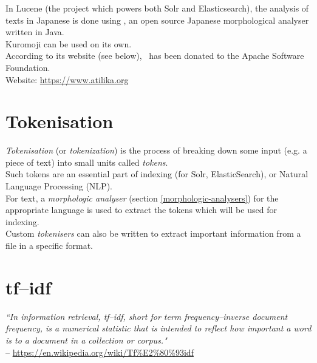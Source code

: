 In Lucene (the project which powers both Solr and Elasticsearch), the analysis of texts in Japanese is done using \kuromoji, an open source Japanese morphological analyser written in Java. \\

Kuromoji can be used on its own. \\

According to its website (see below), \kuromoji\ has been donated to the Apache Software Foundation. \\

Website: \hfill \url{https://www.atilika.org} \hfill \hphantom{.} \\


\section{Tokenisation} \label{tokenisation}

\emph{Tokenisation} (or \emph{tokenization}) is the process of breaking down some input (e.g. a piece of text) into small units called \emph{tokens}. \\ 

Such tokens are an essential part of indexing (for Solr, ElasticSearch), or Natural Language Processing (NLP). \\

For text, a \emph{morphologic analyser} (section \ref{morphologic-analysers}) for the appropriate language is used to extract the tokens which will be used for indexing. \\

Custom \emph{tokenisers} can also be written to extract important information from a file in a specific format. \\


\section{tf–idf} \label{tf–idf}


\begin{displayquote}
\emph{``In information retrieval, \emph{tf–idf}, short for \emph{term frequency–inverse document frequency}, is a numerical statistic that is intended to reflect how important a word is to a document in a collection or corpus."}  \\
\phantom{.} \hfill -- \url{https://en.wikipedia.org/wiki/Tf%E2%80%93idf}
\end{displayquote}
\bigskip

